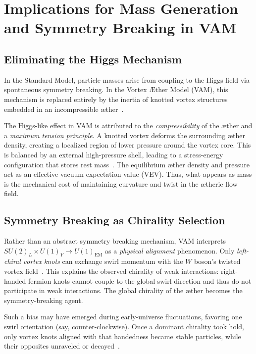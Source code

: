 \documentclass[11pt]{article}
\begin{document}
\section*{Implications for Mass Generation and Symmetry Breaking in VAM}

\subsection*{Eliminating the Higgs Mechanism}

In the Standard Model, particle masses arise from coupling to the Higgs field via spontaneous symmetry breaking. In the Vortex Æther Model (VAM), this mechanism is replaced entirely by the inertia of knotted vortex structures embedded in an incompressible æther~\cite{iskandarani2025vam5}.

The Higgs-like effect in VAM is attributed to the \emph{compressibility} of the æther and a \emph{maximum tension principle}. A knotted vortex deforms the surrounding æther density, creating a localized region of lower pressure around the vortex core. This is balanced by an external high-pressure shell, leading to a stress-energy configuration that stores rest mass~\cite{iskandarani2025vam5}. The equilibrium æther density and pressure act as an effective vacuum expectation value (VEV). Thus, what appears as mass is the mechanical cost of maintaining curvature and twist in the ætheric flow field.

\subsection*{Symmetry Breaking as Chirality Selection}

Rather than an abstract symmetry breaking mechanism, VAM interprets $SU(2)_L \times U(1)_Y \rightarrow U(1)_{\text{EM}}$ as a \emph{physical alignment} phenomenon. Only \emph{left-chiral vortex knots} can exchange swirl momentum with the $W$ boson’s twisted vortex field~\cite{iskandarani2025vam5}. This explains the observed chirality of weak interactions: right-handed fermion knots cannot couple to the global swirl direction and thus do not participate in weak interactions. The global chirality of the æther becomes the symmetry-breaking agent.

Such a bias may have emerged during early-universe fluctuations, favoring one swirl orientation (say, counter-clockwise). Once a dominant chirality took hold, only vortex knots aligned with that handedness became stable particles, while their opposites unraveled or decayed~\cite{iskandarani2025vam5}.
\end{document}
